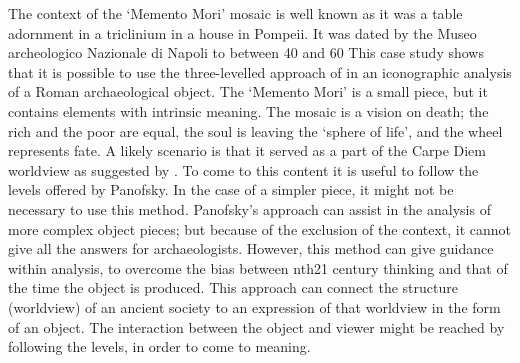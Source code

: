 The context of the ‘Memento Mori’ mosaic is well known as it was a table adornment in a triclinium in a house in Pompeii. It was dated by the Museo archeologico Nazionale di Napoli to between 40 \AD and 60 \AD This case study shows that it is possible to use the three-levelled approach of \textcite{Panofsky_1939}  in an iconographic analysis of a Roman archaeological object. The ‘Memento Mori’ is a small piece, but it contains elements with intrinsic meaning. The mosaic is a vision on death; the rich and the poor are equal, the soul is leaving the ‘sphere of life’, and the wheel represents fate. A likely scenario is that it served as a part of the Carpe Diem worldview as suggested by \textcite {Hope_2009}. To come to this content it is useful to follow the levels offered by Panofsky. In the case of a simpler piece, it might not be necessary to use this method. Panofsky’s approach can assist in the analysis of more complex object pieces; but because of the exclusion of the context, it cannot give all the answers for archaeologists. However, this method can give guidance within analysis, to overcome the bias between nth{21} century thinking and that of the time the object is produced. This approach can connect the structure (worldview) of an ancient society to an expression of that worldview in the form of an object. The interaction between the object and viewer might be reached by following the levels, in order to come to meaning.

